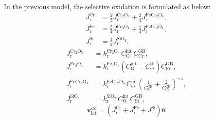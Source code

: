 \documentclass[12pt]{article}
\newcommand{\GB}{\mathrm{GB}}
\newcommand{\intf}{\mathrm{int}}       %
\newcommand{\thr}{\mathrm{th}}         %
\newcommand{\lat}{\mathrm{lat}}
\newcommand{\ox}{\mathrm{ox}}
\newcommand{\Ox}{\mathrm{O}}           %
\begin{document}
In the previous model, the selective oxidation is formulated as below:
\begin{align}
J_{\mathrm{r}}^{\mathrm{Cr}}
 &= \tfrac{2}{3}J_{\mathrm{r}}^{\mathrm{Cr_2O_3}}
   +\tfrac{2}{4}J_{\mathrm{r}}^{\mathrm{FeCr_2O_4}},
\label{eq:sink-cr}\\
J_{\mathrm{r}}^{\mathrm{Fe}}
 &= \tfrac{3}{4}J_{\mathrm{r}}^{\mathrm{Fe_3O_4}}
   +\tfrac{1}{4}J_{\mathrm{r}}^{\mathrm{FeCr_2O_4}},
\label{eq:sink-fe}\\
J_{\mathrm{r}}^{\mathrm{Si}}
 &= \tfrac{1}{2}J_{\mathrm{r}}^{\mathrm{SiO_2}} .
\label{eq:sink-si}
\end{align}
\begin{align}
J_{\mathrm{r}}^{\mathrm{Cr_2O_3}}
 &= k_{\mathrm{r}}^{\mathrm{Cr_2O_3}}\,
    C_{\Ox}^{\intf}\,C_{\mathrm{Cr}}^{\GB},
\label{eq:rate-cr2o3}\\
J_{\mathrm{r}}^{\mathrm{Fe_3O_4}}
 &= k_{\mathrm{r}}^{\mathrm{Fe_3O_4}}
    \left(C_{\Ox}^{\intf}-C_{\Ox}^{\thr}\right)
    C_{\mathrm{Fe}}^{\GB},
\label{eq:rate-fe3o4}\\
J_{\mathrm{r}}^{\mathrm{FeCr_2O_4}}
 &= k_{\mathrm{r}}^{\mathrm{FeCr_2O_4}}\,
    C_{\Ox}^{\intf}
    \left(\frac{1}{C_{\mathrm{Fe}}^{\GB}}
         +\frac{2}{C_{\mathrm{Cr}}^{\GB}}\right)^{-1},
\label{eq:rate-fecr2o4}\\
J_{\mathrm{r}}^{\mathrm{SiO_2}}
 &= k_{\mathrm{r}}^{\mathrm{SiO_2}}\,
    C_{\Ox}^{\intf}\,C_{\mathrm{Si}}^{\GB},
\label{eq:rate-sio2}
\end{align}
\begin{equation}
\mathbf{v}_{\lat}^{\ox}=\left(J_{\mathrm{r}}^{\mathrm{Cr}}+J_{\mathrm{r}}^{\mathrm{Fe}}
  +J_{\mathrm{r}}^{\mathrm{Si}}\right)\hat{\mathbf{n}}
\label{eq:vlat-ox}
\end{equation}
\end{document}
